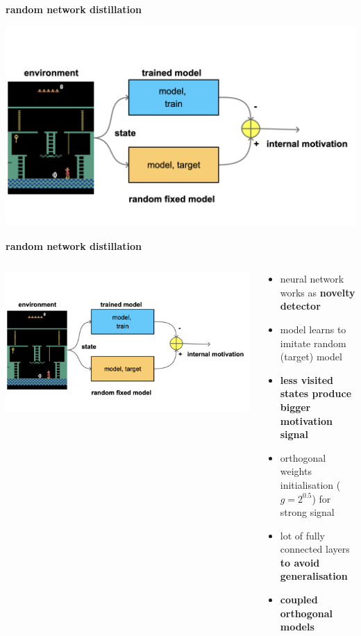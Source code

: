\documentclass[xcolor=dvipsnames]{beamer}
\begin{document}
\begin{frame}{\bf random network distillation}

\centering
\includegraphics[scale=0.15]{../diagrams/rnd/rnd.png}

\end{frame}

\begin{frame}{\bf random network distillation}

  \begin{columns}

    \begin{column}{0.5\textwidth}
      \includegraphics[scale=0.1]{../diagrams/rnd/rnd.png}
    \end{column}

    \begin{column}{0.5\textwidth}
      \begin{itemize}
        \item neural network works as {\bf novelty detector}
        \item model learns to imitate random (target) model
        \item {\bf less visited states produce bigger motivation signal}
        \item orthogonal weights initialisation ($g=2^{0.5}$) for strong signal
        \item lot of fully connected layers {\bf to avoid generalisation}
        \item {\bf coupled orthogonal models}
      \end{itemize}
    \end{column}


  \end{columns}

\end{frame}
\end{document}
